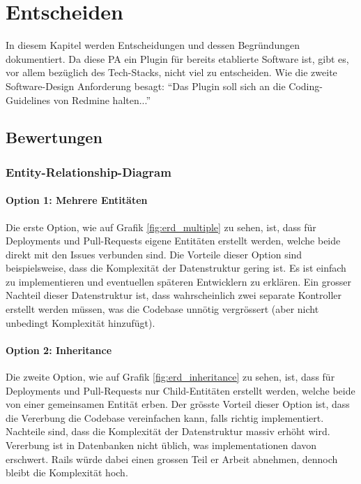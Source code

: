 \chapter{Entscheiden}
\label{chap:decide}
In diesem Kapitel werden Entscheidungen und dessen Begründungen dokumentiert. \newline
Da diese PA ein Plugin für bereits etablierte Software ist, gibt es, vor allem bezüglich des Tech-Stacks, nicht viel zu
entscheiden. Wie die zweite Software-Design Anforderung besagt: \enquote{Das Plugin soll sich an die Coding-Guidelines von
Redmine halten...}

\section{Bewertungen}
\subsection{Entity-Relationship-Diagram}
\subsubsection{Option 1: Mehrere Entitäten}
Die erste Option, wie auf Grafik \ref{fig:erd_multiple} zu sehen, ist, dass für Deployments und Pull-Requests
eigene Entitäten erstellt werden, welche beide direkt mit den Issues verbunden sind. \newline
Die Vorteile dieser Option sind beispielsweise, dass die Komplexität der Datenstruktur gering ist. Es ist einfach zu
implementieren und eventuellen späteren Entwicklern zu erklären. \newline
Ein grosser Nachteil dieser Datenstruktur ist, dass wahrscheinlich zwei separate Kontroller erstellt werden müssen, was
die Codebase unnötig vergrössert (aber nicht unbedingt Komplexität hinzufügt). \newline

\subsubsection{Option 2: Inheritance}
Die zweite Option, wie auf Grafik \ref{fig:erd_inheritance} zu sehen, ist, dass für Deployments und Pull-Requests nur
Child-Entitäten erstellt werden, welche beide von einer gemeinsamen Entität erben. \newline
Der grösste Vorteil dieser Option ist, dass die Vererbung die Codebase vereinfachen kann, falls richtig implementiert.
\newline
Nachteile sind, dass die Komplexität der Datenstruktur massiv erhöht wird. Vererbung ist in Datenbanken nicht üblich, was
implementationen davon erschwert. Rails würde dabei einen grossen Teil er Arbeit abnehmen, dennoch bleibt die Komplexität
hoch.

